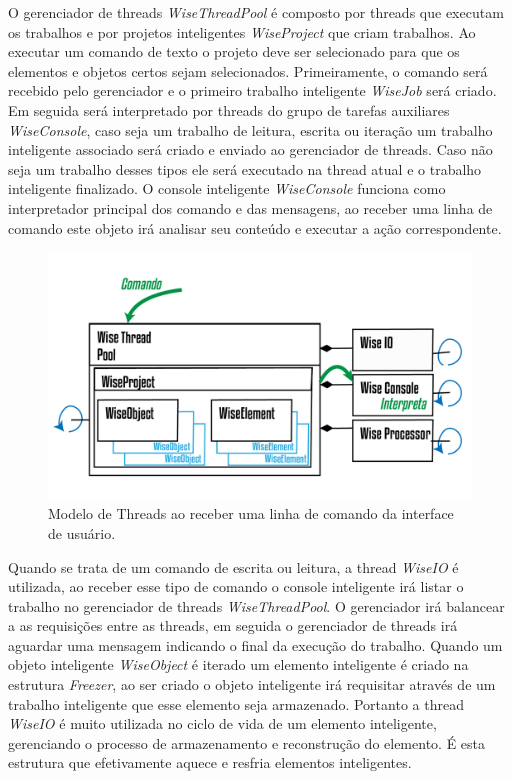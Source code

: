 \documentclass[a4paper,12pt]{monografia}
\theoremstyle{plain}
\theoremstyle{definition}
\theoremstyle{remark}
\begin{document}
O gerenciador de threads \textit{WiseThreadPool} é composto por threads que executam os trabalhos e por projetos inteligentes \textit{WiseProject} que criam trabalhos. Ao executar um comando de texto o projeto deve ser selecionado para que os elementos e objetos certos sejam selecionados. Primeiramente, o comando será recebido pelo gerenciador e o primeiro trabalho inteligente \textit{WiseJob} será criado. Em seguida será interpretado por threads do grupo de tarefas auxiliares \textit{WiseConsole}, caso seja um trabalho de leitura, escrita ou iteração um trabalho inteligente associado será criado e enviado ao gerenciador de threads. Caso não seja um trabalho desses tipos ele será executado na thread atual e o trabalho inteligente finalizado. O console inteligente \textit{WiseConsole} funciona como interpretador principal dos comando e das mensagens, ao receber uma linha de comando este objeto irá analisar seu conteúdo e executar a ação correspondente.

\begin{figure}[!htbp]
	\centering
	\includegraphics[scale=1]{Figures/WiseThreaPoolCMD.png}
	\caption{Modelo de Threads ao receber uma linha de comando da interface de usuário.}
	\label{fig8:threads}
\end{figure}

Quando se trata de um comando de escrita ou leitura, a thread \textit{WiseIO} é utilizada, ao receber esse tipo de comando o console inteligente irá listar o trabalho no gerenciador de threads \textit{WiseThreadPool}. O gerenciador irá balancear a as requisições entre as threads, em seguida o gerenciador de threads irá aguardar uma mensagem indicando o final da execução do trabalho. Quando um objeto inteligente \textit{WiseObject} é iterado um elemento inteligente é criado na estrutura \textit{Freezer}, ao ser criado o objeto inteligente irá requisitar através de um trabalho inteligente que esse elemento seja armazenado. Portanto a thread \textit{WiseIO} é muito utilizada no ciclo de vida de um elemento inteligente, gerenciando o processo de armazenamento e reconstrução do elemento. É esta estrutura que efetivamente aquece e resfria elementos inteligentes.
\end{document}
